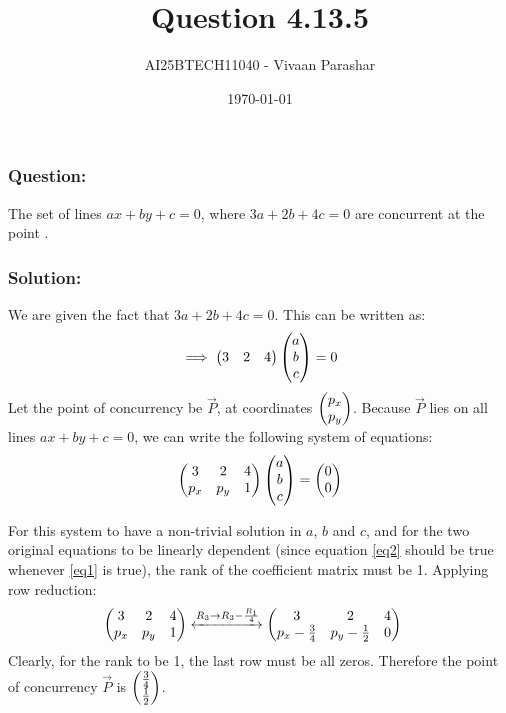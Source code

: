 \documentclass{beamer}
\title{Question 4.13.5}
\author{AI25BTECH11040 - Vivaan Parashar}
\date{\today}
\begin{document}
\frame{\titlepage}

\begin{frame}
    \frametitle{Question: }
    The set of lines $ax + by + c = 0$, where $3a + 2b + 4c = 0$ are concurrent at the point \underline{\hspace{2cm}}.
\end{frame}

\begin{frame}
    \frametitle{Solution: }
    We are given the fact that $3a + 2b + 4c = 0$. This can be written as:
    \begin{align}
        \implies \begin{pmatrix}3 & 2 & 4\end{pmatrix} \begin{pmatrix}a \\ b \\ c\end{pmatrix} = 0 \label{eq1}
    \end{align}
    Let the point of concurrency be $\vec{P}$, at coordinates $\begin{pmatrix}p_x \\ p_y\end{pmatrix}$. Because $\vec{P}$ lies on all lines $ax + by + c = 0$, we can write the following system of equations:
    \begin{align}
        \begin{pmatrix}3 & 2 & 4 \\ p_x & p_y & 1\end{pmatrix} \begin{pmatrix}a \\ b \\ c\end{pmatrix} = \begin{pmatrix}0 \\ 0\end{pmatrix} \label{eq2}
    \end{align}
\end{frame}
\begin{frame}
    For this system to have a non-trivial solution in $a$, $b$ and $c$, and for the two original equations to be linearly dependent (since equation \ref{eq2} should be true whenever \ref{eq1} is true), the rank of the coefficient matrix must be 1.
    Applying row reduction:
    \begin{align}
        \begin{pmatrix}3 & 2 & 4 \\ p_x & p_y & 1\end{pmatrix} &\xleftrightarrow{R_3 \rightarrow R_3 - \frac{R_1}{4}} \begin{pmatrix}3 & 2 & 4 \\ p_x - \frac{3}{4} & p_y - \frac{1}{2} & 0\end{pmatrix}
    \end{align}
    Clearly, for the rank to be 1, the last row must be all zeros. Therefore the point of concurrency $\vec{P}$ is  $\begin{pmatrix}\frac{3}{4} \\ \frac{1}{2}\end{pmatrix}$.
\end{frame}
\end{document}
